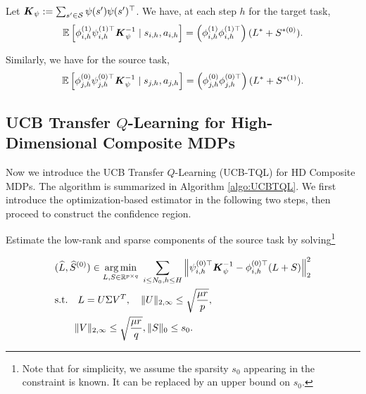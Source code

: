 Let $\boldsymbol{K}_{\psi} := \sum_{s'\in{\cal S}} \psi(s') \psi(s')^\top$. 
We have, at each step $h$ for the target task, 
\[\mathbb{E}\left[ \phi_{i,h}^{(1)}\psi_{i,h}^{(1)\top} \boldsymbol{K}_{\psi}^{-1} \mid s_{i,h}, a_{i,h} \right] = \left( \phi_{i,h}^{(1)} \phi_{i,h}^{(1)\top} \right) ( L^* +  S^{*(0)}).\]
    
Similarly, we have for the source task, 
\[\mathbb{E}\left[ \phi_{j,h}^{(0)}\psi_{j,h}^{(0)\top} \boldsymbol{K}_{\psi}^{-1} \mid s_{j,h}, a_{j,h} \right]= \left( \phi_{j,h}^{(0)} \phi_{j,h}^{(0)\top} \right) ( L^* +  S^{*(1)}).\]


\subsection{UCB Transfer $Q$-Learning for High-Dimensional Composite MDPs}

Now we introduce the UCB Transfer $Q$-Learning (UCB-TQL) for HD Composite MDPs. The algorithm is summarized in Algorithm \ref{algo:UCBTQL}. We first introduce the optimization-based estimator in the following two steps, then proceed to construct the confidence region.

 Estimate the low-rank and sparse components of the source task by solving\footnote{
Note that for simplicity, we assume the sparsity $s_0$ appearing in the constraint is known. It can be replaced by an upper bound on $s_0$. 
} 


\begin{equation}
\begin{aligned}
&(\widehat{L}, \widehat{S}^{(0)}) \in 
\underset{L, S \in \mathbb{R}^{p \times q}}{\arg\min}\;  \sum_{i\le N_0, h \le H}\left\|\psi_{i,h}^{(0)\top} \boldsymbol{K}_{\psi}^{-1}-\phi_{i,h}^{(0)\top}(L+S)\right\|_{2}^{2}   \\
&\text{s.t.}\quad L= U\Sigma V^T,
\quad \|U\|_{2,\infty} \leq \sqrt{\frac{\mu r}{p}}, \\
&\qquad \|V\|_{2,\infty} \leq \sqrt{\frac{\mu r}{q}}, \| S\|_{0}\le s_0.
\end{aligned}
\label{eq:tl-step1}
\end{equation}

